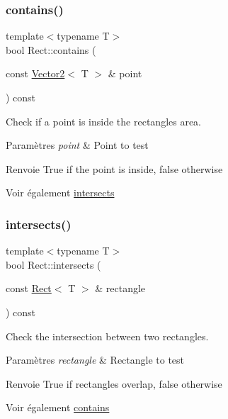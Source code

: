 \subsubsection{\texorpdfstring{contains()}{contains()}\hspace{0.1cm}{\footnotesize\ttfamily [2/2]}}
{\footnotesize\ttfamily template$<$typename T$>$ \\
bool Rect\+::contains (\begin{DoxyParamCaption}\item[{const \hyperlink{classsf_1_1Vector2}{Vector2}$<$ T $>$ \&}]{point }\end{DoxyParamCaption}) const}



Check if a point is inside the rectangle\textquotesingle{}s area. 


\begin{DoxyParams}{Paramètres}
{\em point} & Point to test\\
\hline
\end{DoxyParams}
\begin{DoxyReturn}{Renvoie}
True if the point is inside, false otherwise
\end{DoxyReturn}
\begin{DoxySeeAlso}{Voir également}
\hyperlink{classsf_1_1Rect_ad90321b1135cad31589f2db2f9b772db}{intersects} 
\end{DoxySeeAlso}
\mbox{\label{classsf_1_1Rect_ad90321b1135cad31589f2db2f9b772db}} 
\subsubsection{\texorpdfstring{intersects()}{intersects()}\hspace{0.1cm}{\footnotesize\ttfamily [1/2]}}
{\footnotesize\ttfamily template$<$typename T$>$ \\
bool Rect\+::intersects (\begin{DoxyParamCaption}\item[{const \hyperlink{classsf_1_1Rect}{Rect}$<$ T $>$ \&}]{rectangle }\end{DoxyParamCaption}) const}



Check the intersection between two rectangles. 


\begin{DoxyParams}{Paramètres}
{\em rectangle} & Rectangle to test\\
\hline
\end{DoxyParams}
\begin{DoxyReturn}{Renvoie}
True if rectangles overlap, false otherwise
\end{DoxyReturn}
\begin{DoxySeeAlso}{Voir également}
\hyperlink{classsf_1_1Rect_a1d8a4a3aecec18310f6e3e23db43dfb8}{contains} 
\end{DoxySeeAlso}
\mbox{\label{classsf_1_1Rect_a555557c511ad6bfe0359a97c0ce1a003}} 
